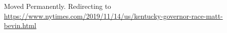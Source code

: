 Moved Permanently. Redirecting to
\url{https://www.nytimes.com/2019/11/14/us/kentucky-governor-race-matt-bevin.html}
